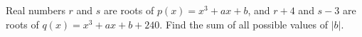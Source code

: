 Real numbers $r$ and $s$ are roots of $p(x)=x^3+ax+b$,  and $r+4$ and $s-3$ are roots of $q(x)=x^3+ax+b+240$.  Find the sum of all possible values of $|b|$.